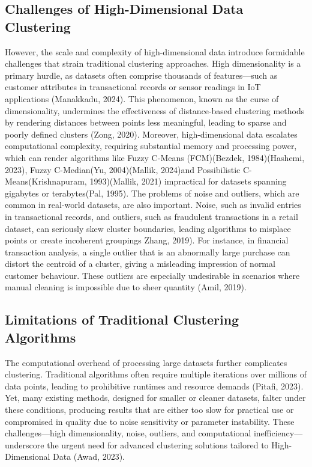 \documentclass[twoside,11pt]{article}
\begin{document}
\subsection{Challenges of High-Dimensional Data Clustering}
However, the scale and complexity of high-dimensional data introduce formidable challenges that strain traditional clustering approaches. High dimensionality is a primary hurdle, as datasets often comprise thousands of features—such as customer attributes in transactional records or sensor readings in IoT applications (Manakkadu, 2024). This phenomenon, known as the curse of dimensionality, undermines the effectiveness of distance-based clustering methods by rendering distances between points less meaningful, leading to sparse and poorly defined clusters (Zong, 2020). Moreover, high-dimensional data escalates computational complexity, requiring substantial memory and processing power, which can render algorithms like Fuzzy C-Means (FCM)(Bezdek, 1984)(Hashemi, 2023), Fuzzy C-Median(Yu, 2004)(Mallik, 2024)and Possibilistic C-Means(Krishnapuram, 1993)(Mallik, 2021) impractical for datasets spanning gigabytes or terabytes(Pal, 1995).
The problems of noise and outliers, which are common in real-world datasets, are also important. Noise, such as invalid entries in transactional records, and outliers, such as fraudulent transactions in a retail dataset, can seriously skew cluster boundaries, leading algorithms to misplace points or create incoherent groupings Zhang, 2019). For instance, in financial transaction analysis, a single outlier that is an abnormally large purchase can distort the centroid of a cluster, giving a misleading impression of normal customer behaviour. These outliers are especially undesirable in scenarios where manual cleaning is impossible due to sheer quantity (Amil, 2019).



\subsection{Limitations of Traditional Clustering Algorithms}
The computational overhead of processing large datasets further complicates clustering. Traditional algorithms often require multiple iterations over millions of data points, leading to prohibitive runtimes and resource demands (Pitafi, 2023). Yet, many existing methods, designed for smaller or cleaner datasets, falter under these conditions, producing results that are either too slow for practical use or compromised in quality due to noise sensitivity or parameter instability. These challenges—high dimensionality, noise, outliers, and computational inefficiency—underscore the urgent need for advanced clustering solutions tailored to High-Dimensional Data (Awad, 2023). 
\end{document}

